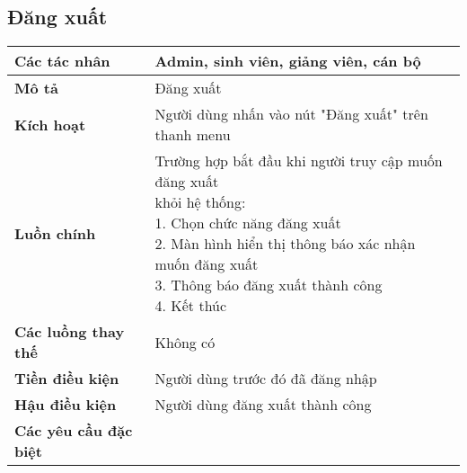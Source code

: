 	\subsection*{Đăng xuất}
	\begin{tabular}{|l|p{}|}
		\hline
		\textbf{Các tác nhân}         & Admin, sinh viên, giảng viên, cán bộ                              \\
		\hline
		\textbf{Mô tả}                & Đăng xuất                                                                        \\
		\hline
		\textbf{Kích hoạt}            & Người dùng nhấn vào nút "Đăng xuất" trên thanh menu                              \\
		\hline
		\textbf{Luồn chính}           & \makecell[l]{Trường hợp bắt đầu khi người truy cập muốn đăng xuất \\ khỏi hệ thống: \\ 1. Chọn chức năng đăng xuất \\ 2. Màn hình hiển thị thông báo xác nhận muốn đăng xuất \\ 3. Thông báo đăng xuất thành công \\ 4. Kết thúc} \\
		\hline
		\textbf{Các luồng thay thế}   & Không có                                                                         \\
		\hline
		\textbf{Tiền điều kiện}       & Người dùng trước đó đã đăng nhập                                                 \\
		\hline
		\textbf{Hậu điều kiện}        & Người dùng đăng xuất thành công                                                  \\
		\hline
		\textbf{Các yêu cầu đặc biệt} &                                                                                  \\
		\hline
	\end{tabular}

